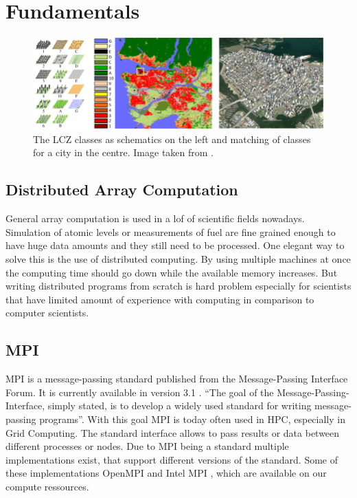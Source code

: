 \section{Fundamentals}
\label{sec:fundamentals}

\begin{figure}[t]
  \centering
  \includegraphics[width=0.9\linewidth]{images/schematic-lcz.png}
  \caption{The LCZ classes as schematics on the left and matching of classes for a city in the centre. Image taken from \cite{zhu_so2sat_2019}.}\label{fig:lcz_classes}
\end{figure}


\subsection{Distributed Array Computation}
\label{subsec:distributed_array_computation}
General array computation is used in a lof of scientific fields nowadays.
Simulation of atomic levels or measurements of fuel are fine grained enough to have huge data amounts
and they still need to be processed.
One elegant way to solve this is the use of distributed computing. By using multiple machines at once
the computing time should go down while the available memory increases.
But writing distributed programs from scratch is hard problem especially for scientists that have limited amount
of experience with computing in comparison to computer scientists.

\subsection{MPI}
\label{subec:mpi}
\gls{MPI} is a message-passing standard published from the Message-Passing Interface Forum. It is currently available in version 3.1 \cite{message_passing_interface_forum_mpi_nodate}.
\enquote{The goal of the Message-Passing-Interface, simply stated, is to develop a widely used standard for writing message-passing programs}\cite{message_passing_interface_forum_mpi_nodate}.
With this goal \gls{MPI} is today often used in \gls{HPC}, especially in Grid Computing. The standard interface allows to pass results or data between different processes or nodes.
Due to \gls{MPI} being a standard multiple implementations exist, that support different versions of the standard.
Some of these implementations OpenMPI \cite{noauthor_open_nodate} and Intel MPI \cite{noauthor_intel_nodate}, which are available on our compute ressources.

